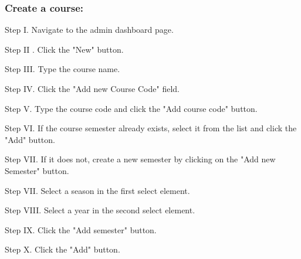\subsubsection{Create a course:}



\begin{userManualItemlist}
    \item[Step I.] Navigate to the admin dashboard page.
    \item[Step II]. Click the "New" button.
    \item[Step III.] Type the course name.
    \item[Step IV.] Click the "Add new Course Code" field.
    \item[Step V.] Type the course code and click the "Add course code" button.
    \item[Step VI.] If the course semester already exists, select it from the list and click the "Add" button.
    \item[Step VII.] If it does not, create a new semester by clicking on the "Add new Semester" button.
    \item[Step VII.] Select a season in the first select element.
    \item[Step VIII.] Select a year in the second select element.
    \item[Step IX.] Click the "Add semester" button.
    \item[Step X.] Click the "Add" button.    
\end{userManualItemlist}